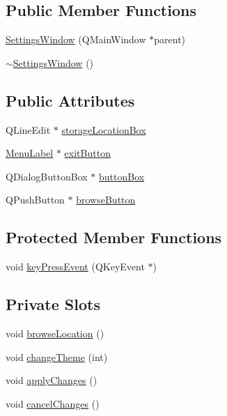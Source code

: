 \subsection*{Public Member Functions}
\begin{DoxyCompactItemize}
\item 
\hyperlink{class_do_lah_1_1_settings_window_aa9d32e9ffdb928d919350c22c2973468}{Settings\+Window} (Q\+Main\+Window $\ast$parent)
\item 
\hyperlink{class_do_lah_1_1_settings_window_a4d7e268c3f9c272c0efb0c3188bfba55}{$\sim$\+Settings\+Window} ()
\end{DoxyCompactItemize}
\subsection*{Public Attributes}
\begin{DoxyCompactItemize}
\item 
Q\+Line\+Edit $\ast$ \hyperlink{class_do_lah_1_1_settings_window_a3154c430f280084ab4d9b558ff4d623a}{storage\+Location\+Box}
\item 
\hyperlink{class_do_lah_1_1_menu_label}{Menu\+Label} $\ast$ \hyperlink{class_do_lah_1_1_settings_window_aa520500f78ff095a3c5b7f8c38ff3299}{exit\+Button}
\item 
Q\+Dialog\+Button\+Box $\ast$ \hyperlink{class_do_lah_1_1_settings_window_a8d32ce14cf7865a6222860ff9b7af1a1}{button\+Box}
\item 
Q\+Push\+Button $\ast$ \hyperlink{class_do_lah_1_1_settings_window_ab8a381394058db1df35afd8de7298321}{browse\+Button}
\end{DoxyCompactItemize}
\subsection*{Protected Member Functions}
\begin{DoxyCompactItemize}
\item 
void \hyperlink{class_do_lah_1_1_settings_window_a4546dc844cd32b0a408b688e9e956107}{key\+Press\+Event} (Q\+Key\+Event $\ast$)
\end{DoxyCompactItemize}
\subsection*{Private Slots}
\begin{DoxyCompactItemize}
\item 
void \hyperlink{class_do_lah_1_1_settings_window_a79acea6560460a4a7bab35c4249285b1}{browse\+Location} ()
\item 
void \hyperlink{class_do_lah_1_1_settings_window_a8c1c13d0c4ab3faa57dbfb2418225cda}{change\+Theme} (int)
\item 
void \hyperlink{class_do_lah_1_1_settings_window_ad64d12b81cf88d037ec8c99244176993}{apply\+Changes} ()
\item 
void \hyperlink{class_do_lah_1_1_settings_window_ad323b6d64af4a865976684be5305888b}{cancel\+Changes} ()
\end{DoxyCompactItemize}
